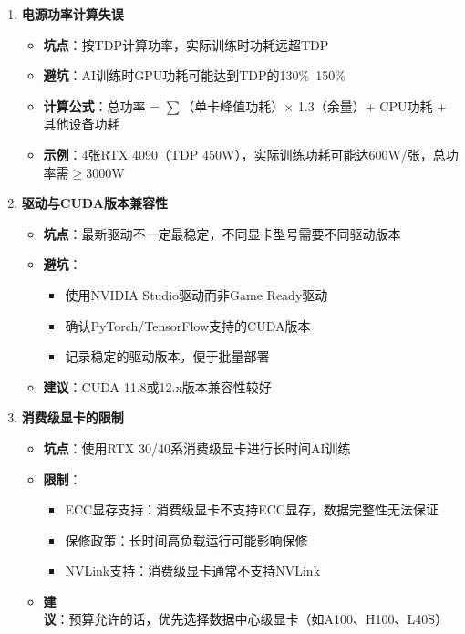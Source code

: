 \documentclass[12pt,UTF8]{ctexbook}
\begin{document}
\begin{enumerate}
    \item \textbf{电源功率计算失误}
    \begin{itemize}[leftmargin=2em]
        \item \textbf{坑点}：按TDP计算功率，实际训练时功耗远超TDP
        \item \textbf{避坑}：AI训练时GPU功耗可能达到TDP的130\%~150\%
        \item \textbf{计算公式}：总功率 = $\sum$（单卡峰值功耗）$\times$ 1.3（余量）+ CPU功耗 + 其他设备功耗
        \item \textbf{示例}：4张RTX 4090（TDP 450W），实际训练功耗可能达600W/张，总功率需$\ge$3000W
    \end{itemize}
    
    \item \textbf{驱动与CUDA版本兼容性}
    \begin{itemize}[leftmargin=2em]
        \item \textbf{坑点}：最新驱动不一定最稳定，不同显卡型号需要不同驱动版本
        \item \textbf{避坑}：
        \begin{itemize}[leftmargin=2em]
            \item 使用NVIDIA Studio驱动而非Game Ready驱动
            \item 确认PyTorch/TensorFlow支持的CUDA版本
            \item 记录稳定的驱动版本，便于批量部署
        \end{itemize}
        \item \textbf{建议}：CUDA 11.8或12.x版本兼容性较好
    \end{itemize}
    
    \item \textbf{消费级显卡的限制}
    \begin{itemize}[leftmargin=2em]
        \item \textbf{坑点}：使用RTX 30/40系消费级显卡进行长时间AI训练
        \item \textbf{限制}：
        \begin{itemize}[leftmargin=2em]
            \item ECC显存支持：消费级显卡不支持ECC显存，数据完整性无法保证
            \item 保修政策：长时间高负载运行可能影响保修
            \item NVLink支持：消费级显卡通常不支持NVLink
        \end{itemize}
        \item \textbf{建议}：预算允许的话，优先选择数据中心级显卡（如A100、H100、L40S）
    \end{itemize}
    

\end{enumerate}
\end{document}
